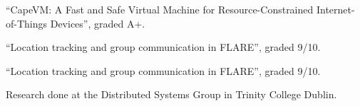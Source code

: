 “CapeVM: A Fast and Safe Virtual Machine for Resource-Constrained Internet-of-Things Devices”, graded A+.

\bigskip


“Location tracking and group communication in FLARE”, graded 9/10.

\bigskip


“Location tracking and group communication in FLARE”, graded 9/10.

\medskip

Research done at the Distributed Systems Group in Trinity College Dublin.








